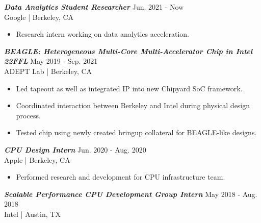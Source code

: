 \documentclass[letter]{res}
\begin{document}
\begin{resume}
{\sl \textbf{Data Analytics Student Researcher}} \hfill Jun. 2021 - Now\\
Google | Berkeley, CA \newline

 \vspace{-4mm}

 \begin{itemize}
 \item Research intern working on data analytics acceleration.
 \end{itemize}

\vspace{-2mm}

{\sl \textbf{BEAGLE: Heterogeneous Multi-Core Multi-Accelerator Chip in Intel 22FFL}} \hfill May 2019 - Sep. 2021\\
ADEPT Lab | Berkeley, CA \newline

 \vspace{-4mm}

 \begin{itemize}
 \item Led tapeout as well as integrated IP into new Chipyard SoC framework.
 \item Coordinated interaction between Berkeley and Intel during physical design process.
 \item Tested chip using newly created bringup collateral for BEAGLE-like designs.
 \end{itemize}

\vspace{-2mm}

{\sl \textbf{CPU Design Intern}} \hfill Jun. 2020 - Aug. 2020\\
Apple | Berkeley, CA \newline

 \vspace{-4mm}

 \begin{itemize}
 \item Performed research and development for CPU infrastructure team.
 \end{itemize}

\vspace{-2mm}

{\sl \textbf{Scalable Performance CPU Development Group Intern}} \hfill May 2018 - Aug. 2018\\
Intel | Austin, TX \newline

 \vspace{-4mm}


\end{resume}
\end{document}
